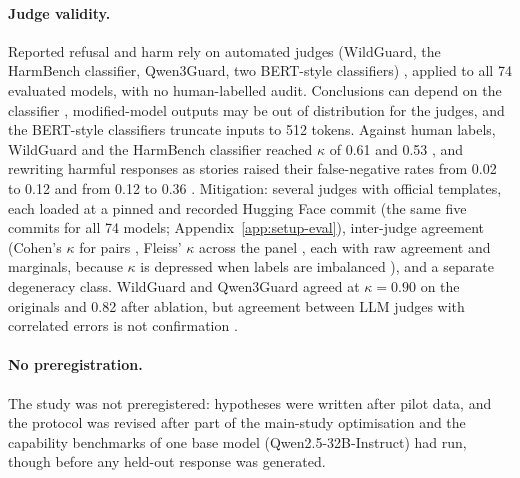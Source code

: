 \paragraph{Judge validity.}
Reported refusal and harm rely on automated judges (WildGuard, the HarmBench
classifier, Qwen3Guard, two BERT-style classifiers)
\cite{han2024wildguard,mazeika2024harmbench,zhao2025qwen3guard}, applied to
all 74 evaluated models, with no human-labelled audit. Conclusions can depend
on the classifier \cite{young2026measuring}, modified-model outputs may be out
of distribution for the judges, and the BERT-style classifiers truncate inputs to
512 tokens. Against human labels, WildGuard and the HarmBench classifier reached
$\kappa$ of 0.61 and 0.53 \cite{xie2025sorrybench}, and rewriting harmful
responses as stories raised their false-negative rates from 0.02 to 0.12 and
from 0.12 to 0.36 \cite{eiras2025know}. Mitigation: several judges with official templates, each
loaded at a pinned and recorded Hugging Face commit (the same five commits for
all 74 models; Appendix~\ref{app:setup-eval}),
inter-judge agreement (Cohen's $\kappa$ for pairs \cite{cohen1960coefficient},
Fleiss' $\kappa$ across the panel \cite{fleiss1971measuring}, each with raw
agreement and marginals, because $\kappa$ is depressed when labels are
imbalanced \cite{feinstein1990high}), and a separate degeneracy class.
WildGuard and Qwen3Guard agreed at $\kappa=0.90$ on the originals and 0.82
after ablation, but agreement between LLM judges with correlated errors is
not confirmation \cite{hossain2026agreement}.

\paragraph{No preregistration.}
The study was not preregistered: hypotheses were written after pilot data, and
the protocol was revised after part of the main-study optimisation and the
capability benchmarks of one base model (Qwen2.5-32B-Instruct) had run, though
before any held-out response was generated.

